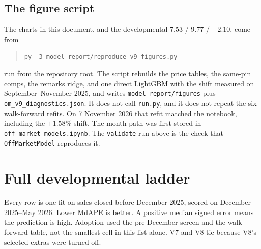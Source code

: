 \documentclass[11pt]{article}
\begin{document}
\subsection{The figure script}

The charts in this document, and the developmental \(7.53\) / \(9.77\) / \(-2.10\), come from
\begin{quote}
\texttt{py -3 model-report/reproduce\_v9\_figures.py}
\end{quote}
run from the repository root. The script rebuilds the price tables, the same-pin comps, the remarks ridge, and one direct LightGBM with the shift measured on September--November 2025, and writes \texttt{model-report/figures} plus \texttt{om\_v9\_diagnostics.json}. It does not call \texttt{run.py}, and it does not repeat the six walk-forward refits. On 7 November 2026 that refit matched the notebook, including the \(+1.58\%\) shift. The month path was first stored in \texttt{off\_market\_models.ipynb}. The \texttt{validate} run above is the check that \texttt{OffMarketModel} reproduces it.


\appendix
\section{Full developmental ladder}
\label{app:ladder}

Every row is one fit on sales closed before December 2025, scored on December 2025--May 2026. Lower MdAPE is better. A positive median signed error means the prediction is high. Adoption used the pre-December screen and the walk-forward table, not the smallest cell in this list alone. V7 and V8 tie because V8's selected extras were turned off.
\end{document}
